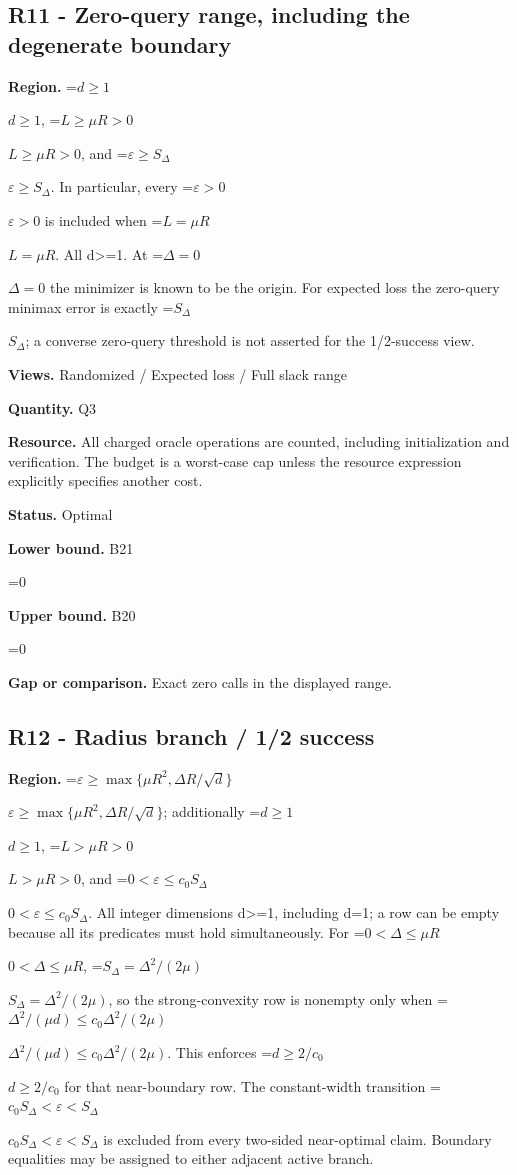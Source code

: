 \documentclass[10pt,a4paper]{article}
\newcommand{\AtlasMath}[1]{\par\begingroup\centering\setbox0=\hbox{$\displaystyle #1$}\ifdim\wd0>1.4\linewidth\typeout{ATLAS WIDE FORMULA: \the\wd0}\fi\ifdim\wd0>\linewidth\resizebox{\linewidth}{!}{\box0}\else\box0\fi\par\endgroup}
\newcommand{\AtlasInlineMath}[1]{\begingroup\setbox0=\hbox{$#1$}\ifdim\wd0>.4\linewidth\endgroup\AtlasMath{#1}\else\endgroup$#1$\fi}
\begin{document}
\subsection{R11 - Zero-query range, including the degenerate boundary}


\textbf{Region.} \AtlasInlineMath{d\ge1}, \AtlasInlineMath{L\ge\mu R>0}, and \AtlasInlineMath{\varepsilon\ge S_\Delta}. In particular, every \AtlasInlineMath{\varepsilon>0} is included when \AtlasInlineMath{L=\mu R}. All d>=1. At \AtlasInlineMath{\Delta=0} the minimizer is known to be the origin. For expected loss the zero-query minimax error is exactly \AtlasInlineMath{S_\Delta}; a converse zero-query threshold is not asserted for the 1/2-success view.



\textbf{Views.} Randomized / Expected loss / Full slack range



\textbf{Quantity.} Q3



\textbf{Resource.} All charged oracle operations are counted, including initialization and verification. The budget is a worst-case cap unless the resource expression explicitly specifies another cost.



\textbf{Status.} Optimal



\textbf{Lower bound.} B21



\AtlasMath{0}


\textbf{Upper bound.} B20



\AtlasMath{0}


\textbf{Gap or comparison.} Exact zero calls in the displayed range.



\subsection{R12 - Radius branch / 1/2 success}


\textbf{Region.} \AtlasInlineMath{\varepsilon\ge\max\{\mu R^2,\Delta R/\sqrt d\}}; additionally \AtlasInlineMath{d\ge1}, \AtlasInlineMath{L>\mu R>0}, and \AtlasInlineMath{0<\varepsilon\le c_0S_\Delta}. All integer dimensions d>=1, including d=1; a row can be empty because all its predicates must hold simultaneously. For \AtlasInlineMath{0<\Delta\le\mu R}, \AtlasInlineMath{S_\Delta=\Delta^2/(2\mu)}, so the strong-convexity row is nonempty only when \AtlasInlineMath{\Delta^2/(\mu d)\le c_0\Delta^2/(2\mu)}. This enforces \AtlasInlineMath{d\ge2/c_0} for that near-boundary row. The constant-width transition \AtlasInlineMath{c_0S_\Delta<\varepsilon<S_\Delta} is excluded from every two-sided near-optimal claim. Boundary equalities may be assigned to either adjacent active branch.
\end{document}
